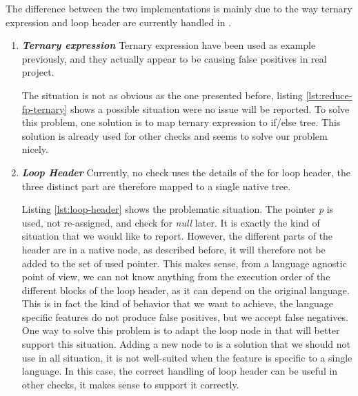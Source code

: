 The difference between the two implementations is mainly due to the way ternary expression and loop header are currently handled in \slang{}.
\begin{enumerate}
	\item \textbf{\textit{Ternary expression}} \newline 
	\label{subsubsec:reducing_false_positive_ternary}
	Ternary expression have been used as example previously, and they actually appear to be causing false positives in real project.
	
	
	
	The situation is not as obvious as the one presented before, listing \ref{lst:reduce-fp-ternary} shows a possible situation were no issue will be reported. 
	To solve this problem, one solution is to map ternary expression to if/else tree.
	This solution is already used for other checks and seems to solve our problem nicely.
	
	\item \textbf{\textit{Loop Header}} \newline 	
	\label{subsubsec:loop_header}
	Currently, no check uses the details of the for loop header, the three distinct part are therefore mapped to a single native tree. 
	
	
	
	Listing \ref{lst:loop-header} shows the problematic situation. 
	The pointer \emph{p} is used, not re-assigned, and check for \emph{null} later. 
	It is exactly the kind of situation that we would like to report. 
	However, the different parts of the header are in a native node, as described before, it will therefore not be added to the set of used pointer.
	This makes sense, from a language agnostic point of view, we can not know anything from the execution order of the different blocks of the loop header, as it can depend on the original language.
	This is in fact the kind of behavior that we want to achieve, the language specific features do not produce false positives, but we accept false negatives.
	One way to solve this problem is to adapt the loop node in \slang{} that will better support this situation.
	Adding a new node to \slang{} is a solution that we should not use in all situation, it is not well-suited when the feature is specific to a single language.
	In this case, the correct handling of loop header can be useful in other checks, it makes sense to support it correctly.
\end{enumerate}

